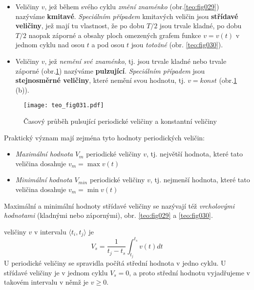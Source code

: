     \begin{itemize}
      \item Veličiny $v$, jež během svého cyklu \emph{změní znaménko} (obr.\ref{teo:fig029})
            nazýváme \textbf{kmitavé}. \emph{Speciálním případem} kmitavých veličin jsou
            \textbf{střídavé veličiny}, jež mají tu vlastnost, že po dobu $T/2$ jsou trvale kladné,
            po dobu $T/2$ naopak záporné a obsahy ploch omezených grafem funkce $v=v(t)$ v jednom
            cyklu nad osou $t$ a pod osou $t$ jsou \emph{totožné} (obr. \ref{teo:fig030}).
      \item Veličiny $v$, jež \emph{nemění své znaménko}, tj. jsou trvale kladné nebo trvale
            záporné (obr.\ref{teo:fig031}) nazýváme \textbf{pulzující}. \emph{Speciálním případem}
            jsou \textbf{stejnosměrné veličiny}, které nemění svou hodnotu, tj. $v=konst$
            (obr.\ref{teo:fig031} (b)).
    \end{itemize} 

    \begin{figure}[ht!] %
       \centering
       \texttt{[image: teo\_fig031.pdf]}
       \caption{Časový průběh pulsující periodické veličiny a konstantní veličiny}
       \label{teo:fig031}
    \end{figure}

    Praktický význam mají zejména tyto hodnoty periodických veličin:
    \begin{itemize}
      \item \emph{Maximální hodnota} $V_m$ periodické veličiny $v$, tj. největší hodnota, které
            tato veličina dosahuje $v_m=\max v(t)$
      \item \emph{Minimální hodnota} $V_{min}$ periodické veličiny $v$, tj. nejmenší hodnota, které
            tato veličina dosahuje $v_m=\min v(t)$
    \end{itemize}
      
    Maximální a minimální hodnoty střídavé veličiny se nazývají též \emph{vrcholovými hodnotami}
    (kladnými nebo zápornými), obr. \ref{teo:fig029} a \ref{teo:fig030}. 
    
     veličiny $v$ v intervalu $\langle t_i, t_j\rangle$ je 
    \begin{equation}\label{TEO:eq_harm03}
      V_s = \frac{1}{t_j-t_s}\int_{t_j}^{t_s}v(t)dt
    \end{equation}
    U periodické veličiny se spravidla počítá střední hodnota v jedno cyklu. U střídavé veličiny je
    v jednom cyklu $V_s = 0$,  a proto střední hodnotu vyjadřujeme v takovém intervalu v němž je
    $v\geq0$.
    
